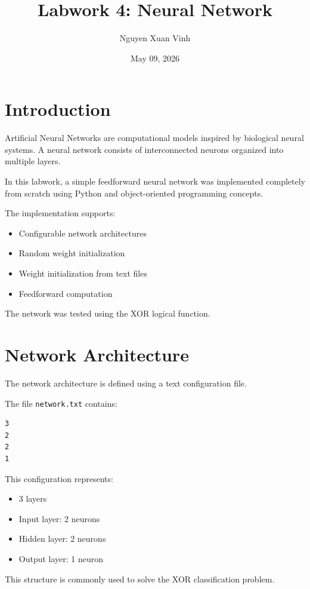 \documentclass[12pt]{article}
\title{Labwork 4: Neural Network}
\author{Nguyen Xuan Vinh}
\date{May 09, 2026}
\begin{document}
\maketitle

\section{Introduction}

Artificial Neural Networks are computational models inspired by biological neural systems. 
A neural network consists of interconnected neurons organized into multiple layers.

In this labwork, a simple feedforward neural network was implemented completely from scratch using Python and object-oriented programming concepts.

The implementation supports:
\begin{itemize}
    \item Configurable network architectures
    \item Random weight initialization
    \item Weight initialization from text files
    \item Feedforward computation
\end{itemize}

The network was tested using the XOR logical function.

\section{Network Architecture}

The network architecture is defined using a text configuration file.

The file \texttt{network.txt} contains:

\begin{verbatim}
3
2
2
1
\end{verbatim}

This configuration represents:
\begin{itemize}
    \item 3 layers
    \item Input layer: 2 neurons
    \item Hidden layer: 2 neurons
    \item Output layer: 1 neuron
\end{itemize}

This structure is commonly used to solve the XOR classification problem.
\end{document}
